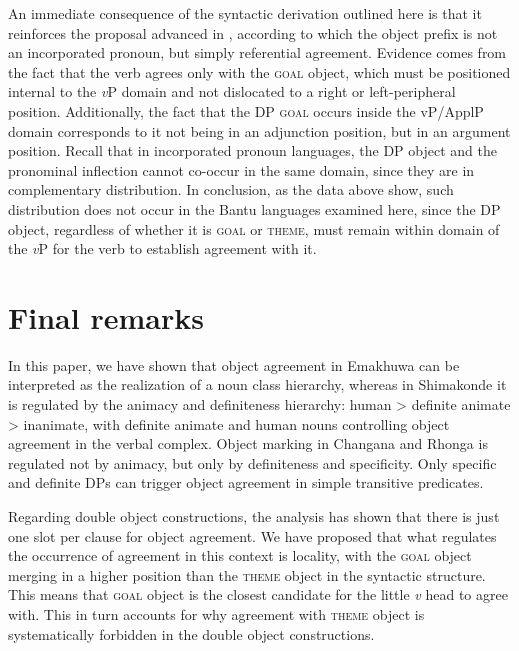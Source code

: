 \documentclass[output=paper]{langsci/langscibook}
\begin{document}
An immediate consequence of the syntactic derivation outlined here is that it reinforces the proposal advanced in , according to which the object prefix is not an incorporated pronoun, but simply referential agreement. Evidence comes from the fact that the verb agrees only with the \textsc{goal} object, which must be positioned internal to the {\textit{v}}P domain and not dislocated to a right or left-peripheral position. Additionally, the fact that the DP \textsc{goal} occurs inside the vP/ApplP domain corresponds to it not being in an adjunction position, but in an argument position. Recall that in incorporated pronoun languages, the DP object and the pronominal inflection cannot co-occur in the same domain, since they are in complementary distribution. In conclusion, as the data above show, such distribution does not occur in the Bantu languages examined here, since the DP object, regardless of whether it is \textsc{goal} or \textsc{theme}, must remain within domain of the {\textit{v}}P for the verb to establish agreement with it.

\section{Final remarks}

In this paper, we have shown that object agreement in Emakhuwa can be interpreted as the realization of a noun class hierarchy, whereas in Shimakonde it is regulated by the animacy and definiteness hierarchy: human {\textgreater} definite animate {\textgreater} inanimate, with definite animate and human nouns controlling object agreement in the verbal complex. Object marking in Changana and Rhonga is regulated not by animacy, but only by definiteness and specificity. Only specific and definite DPs can trigger object agreement in simple transitive predicates.

Regarding double object constructions, the analysis has shown that there is just one slot per clause for object agreement. We have proposed that what regulates the occurrence of agreement in this context is locality, with the \textsc{goal} object merging in a higher position than the \textsc{theme} object in the syntactic structure. This means that \textsc{goal} object is the closest candidate for the little {\textit{v}} head to agree with. This in turn accounts for why agreement with \textsc{theme} object is systematically forbidden in the double object constructions. 
\end{document}
